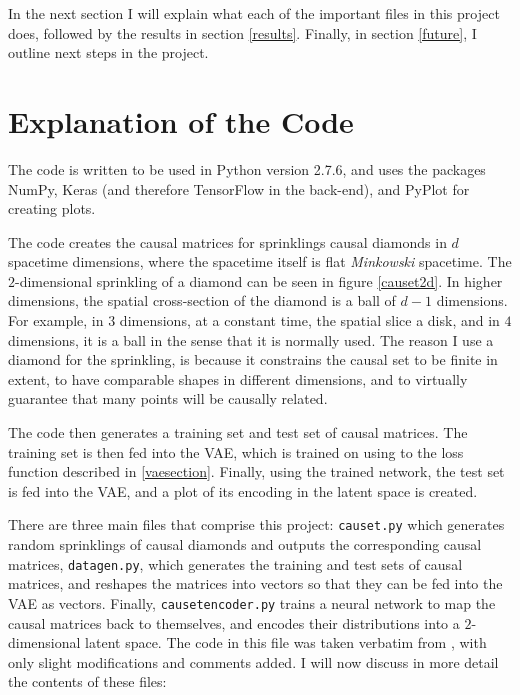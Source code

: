 \documentclass[letterpaper,10pt]{article}
\def\code#1{\texttt{#1}}
\begin{document}
In the next section I will explain what each of the important files in this project does, followed by the results in section \ref{results}.  Finally, 
in section \ref{future}, I outline next steps in the project.

\section{Explanation of the Code}

The code is written to be used in Python version 2.7.6, and uses the packages NumPy, Keras (and therefore TensorFlow in the back-end), and PyPlot for 
creating plots.

The code creates the causal matrices for sprinklings causal diamonds in $d$ spacetime dimensions, where the spacetime itself is flat {\it Minkowski} 
spacetime.  The $2$-dimensional sprinkling of a diamond can be seen in figure \ref{causet2d}.  In higher dimensions, the spatial cross-section of the 
diamond is a ball of $d-1$ dimensions.  For example, in $3$ dimensions, at a constant time, the spatial slice a disk, and in $4$ dimensions, it is a 
ball in the sense that it is normally used.  The reason I use a diamond for the sprinkling, is because it constrains the causal set to be finite in extent, 
to have comparable shapes in different dimensions, and to virtually guarantee that many points will be causally related.

The code then generates a training set and test set of causal matrices. The training set is then fed into the VAE, which is trained on  
using to the loss function described in \ref{vaesection}.  Finally, using the trained network, the test set is fed into the VAE, and a plot of its 
encoding in the latent space is created.

There are three main files that comprise this project: \code{causet.py} which generates random sprinklings of causal diamonds and outputs 
the corresponding causal matrices, \code{datagen.py}, which generates the training and test sets of causal matrices, and reshapes the matrices into vectors so that 
they can be fed into the VAE as vectors.  Finally, \code{causetencoder.py} trains a neural network to map the causal matrices back to themselves, and 
encodes their distributions into a $2$-dimensional latent space.  The code in this file was taken verbatim from 
\cite{kerasauto}, with only slight modifications and comments added.  I will now discuss in more detail the contents of these files:
\end{document}
